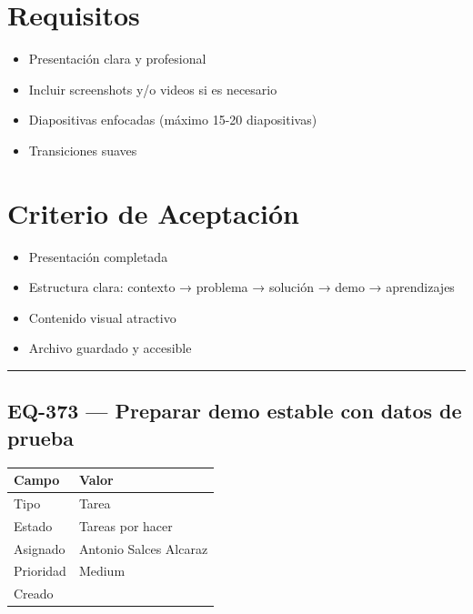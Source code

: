 \documentclass[
  spanish,
  11pt,
]{report}
\newcounter{none} %
\providecommand{\tightlist}{%
  \setlength{\itemsep}{0pt}\setlength{\parskip}{0pt}}
\begin{document}
\section{Requisitos}\label{requisitos-9}

\begin{itemize}
\tightlist
\item
  Presentación clara y profesional
\item
  Incluir screenshots y/o videos si es necesario
\item
  Diapositivas enfocadas (máximo 15-20 diapositivas)
\item
  Transiciones suaves
\end{itemize}

\section{Criterio de Aceptación}\label{criterio-de-aceptaciuxf3n-9}

\begin{itemize}
\tightlist
\item[$\square$]
  Presentación completada
\item[$\square$]
  Estructura clara: contexto → problema → solución → demo → aprendizajes
\item[$\square$]
  Contenido visual atractivo
\item[$\square$]
  Archivo guardado y accesible
\end{itemize}

\begin{center}\rule{0.5\linewidth}{0.5pt}\end{center}

\subsection{EQ-373 --- Preparar demo estable con datos de
prueba}\label{eq-373-preparar-demo-estable-con-datos-de-prueba}

{\def\LTcaptype{none} %
\begin{longtable}[]{@{}ll@{}}
\toprule\noalign{}
Campo & Valor \\
\midrule\noalign{}
\endhead
\bottomrule\noalign{}
\endlastfoot
Tipo & Tarea \\
Estado & Tareas por hacer \\
Asignado & Antonio Salces Alcaraz \\
Prioridad & Medium \\
Creado & \\
\end{longtable}
}
\end{document}
